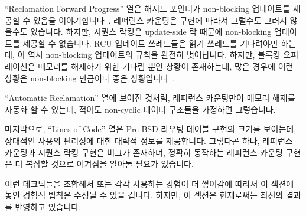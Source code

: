 ``Reclamation Forward Progress'' 열은 해저드 포인터가 non-blocking
업데이트를 제공할 수 있음을 이야기합니다~\cite{MagedMichael04a,HerlihyLM02}.
레퍼런스 카운팅은 구현에 따라서 그럴수도 그러지 않을수도 있습니다.
하지만, 시퀀스 락킹은 update-side 락 때문에 non-blocking 업데이트를 제공할 수
없습니다.
RCU 업데이트 쓰레드들은 읽기 쓰레드를 기다려야만 하는데, 이 역시 non-blocking
업데이트의 규칙을 완전히 벗어납니다.
하지만, 블록킹 오퍼레이션은 메모리를 해제하기 위한 기다림 뿐인 상황이
존재하는데, 많은 경우에 이런 상황은 non-blocking 만큼이나 좋은
상황입니다~\cite{MathieuDesnoyers2012URCU}.
\iffalse

The ``Reclamation Forward Progress'' row shows that hazard pointers
can provide non-blocking updates~\cite{MagedMichael04a,HerlihyLM02}.
Reference counting might or might not, depending on the implementation.
However, sequence locking cannot provide non-blocking updates, courtesy
of its update-side lock.
RCU updaters must wait on readers, which also rules out fully non-blocking
updates.
However, there are situations in which the only blocking operation is
a wait to free memory, which results in an situation that, for many
purposes, is as good as non-blocking~\cite{MathieuDesnoyers2012URCU}.
\fi

``Automatic Reclamation'' 열에 보여진 것처럼, 레퍼런스 카운팅만이 메모리 해제를
자동화 할 수 있는데, 적어도 non-cyclic 데이터 구조들을 가정하면 그렇습니다.

마지막으로, ``Lines of Code'' 열은 Pre-BSD 라우팅 테이블 구현의 크기를
보이는데, 상대적인 사용의 편리성에 대한 대략적 정보를 제공합니다.
그렇다곤 하나, 레퍼런스 카운팅과 시퀀스 락킹 구현은 버그가 존재하며, 정확히
동작하는 레퍼런스 카운팅 구현은 더 복잡할 것으로 여겨짐을 알아둘 필요가
있습니다.
\iffalse

As shown in the ``Automatic Reclamation'' row, only reference
counting can automate freeing of memory, at least assuming non-cyclic
data structures.

Finally, the ``Lines of Code'' row shows the size of the Pre-BSD
Routing Table implementations, giving a rough idea of relative ease of use.
That said, it is important to note that the reference-counting and
sequence-locking implementations are buggy, and that a correct
reference-counting implementation is considerably more complex.
\fi

이런 테크닉들을 조합해서 또는 각각 사용하는 경험이 더 쌓여감에 따라서 이 섹션에
놓인 경험적 법칙은 수정될 수 있을 겁니다.
하지만, 이 섹션은 현재로써는 최선의 결과를 반영하고 있습니다.
\iffalse

As more experience is gained using these techniques, both separately
and in combination, the rules of thumb laid out in this section will
need to be refined.
However, this section does reflect the current state of the art.
\fi
